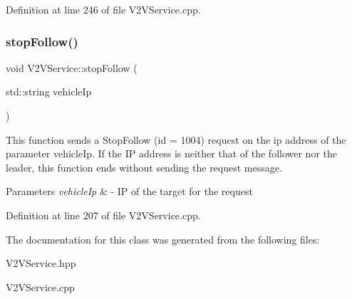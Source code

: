 Definition at line 246 of file V2\+V\+Service.\+cpp.

\mbox{\label{class_v2_v_service_ad25bfe4c2a0a170f06a1a1f0bf7965c7}} 
\subsubsection{\texorpdfstring{stop\+Follow()}{stopFollow()}}
{\footnotesize\ttfamily void V2\+V\+Service\+::stop\+Follow (\begin{DoxyParamCaption}\item[{std\+::string}]{vehicle\+Ip }\end{DoxyParamCaption})}

This function sends a Stop\+Follow (id = 1004) request on the ip address of the parameter vehicle\+Ip. If the IP address is neither that of the follower nor the leader, this function ends without sending the request message.


\begin{DoxyParams}{Parameters}
{\em vehicle\+Ip} & -\/ IP of the target for the request \\
\hline
\end{DoxyParams}


Definition at line 207 of file V2\+V\+Service.\+cpp.



The documentation for this class was generated from the following files\+:\begin{DoxyCompactItemize}
\item 
V2\+V\+Service.\+hpp\item 
V2\+V\+Service.\+cpp\end{DoxyCompactItemize}
